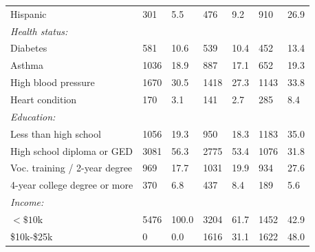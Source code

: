\documentclass{beamer}
\begin{document}
\begin{frame}
{\begin{singlespace}
\begin{landscape}
\begin{longtable}{lllllll}
\hspace{3mm}Hispanic & 301 & 5.5 & 476 & 9.2 & 910 & 26.9  \\ 
\textit{Health status:} &  & & &  &  & \\ 
\hspace{3mm}Diabetes & 581 & 10.6 & 539 & 10.4 & 452 & 13.4 \\ 

\hspace{3mm}Asthma & 1036 & 18.9 & 887 & 17.1 & 652 & 19.3  \\ 

\hspace{3mm}High blood pressure & 1670 & 30.5 & 1418 & 27.3 & 1143 & 33.8  \\ 
  
\hspace{3mm}Heart condition & 170 & 3.1 & 141 & 2.7 & 285 & 8.4 \\ 
\textit{Education:} &  & & &  &  & \\  
\hspace{3mm}Less than high school  & 1056 & 19.3 & 950 & 18.3 & 1183 & 35.0  \\ 
  
\hspace{3mm}High school diploma or GED & 3081 & 56.3 & 2775 & 53.4 & 1076 & 31.8  \\ 

\hspace{3mm}Voc. training / 2-year degree & 969 & 17.7 & 1031 & 19.9 & 934 & 27.6 \\ 

\hspace{3mm}4-year college degree or more & 370 & 6.8 & 437 & 8.4 & 189 & 5.6 \\ 
\textit{Income:} &  & & &  &  & \\ 
\hspace{3mm} $<\$10$k & 5476 & 100.0 & 3204 & 61.7 & 1452 & 42.9 \\

\hspace{3mm} \$10k-\$25k & 0 & 0.0 & 1616 & 31.1 & 1622 & 48.0 \\


\end{longtable}
\end{landscape}
\end{singlespace}}
\end{frame}
\end{document}
